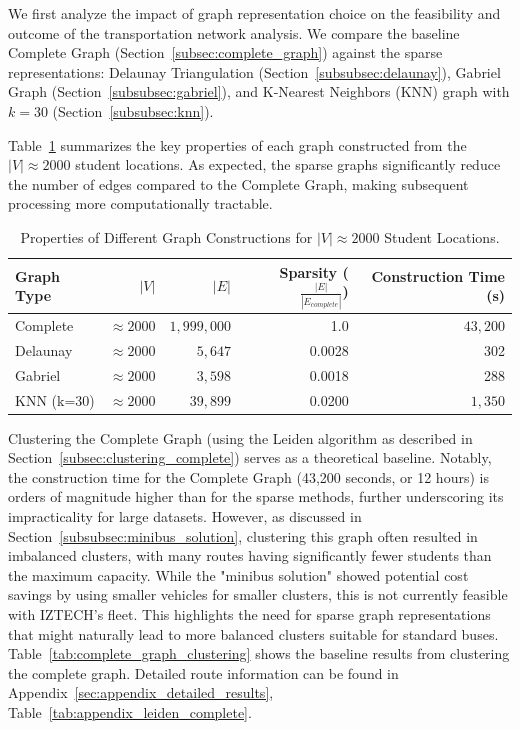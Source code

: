We first analyze the impact of graph representation choice on the feasibility and outcome of the transportation network analysis. We compare the baseline Complete Graph (Section~\ref{subsec:complete_graph}) against the sparse representations: Delaunay Triangulation (Section~\ref{subsubsec:delaunay}), Gabriel Graph (Section~\ref{subsubsec:gabriel}), and K-Nearest Neighbors (KNN) graph with $k=30$ (Section~\ref{subsubsec:knn}).

Table~\ref{tab:graph_properties} summarizes the key properties of each graph constructed from the $|V| \approx 2000$ student locations. As expected, the sparse graphs significantly reduce the number of edges compared to the Complete Graph, making subsequent processing more computationally tractable.

\begin{table}[h]
\centering
\label{tab:graph_properties}
\begin{tabular}{lrrrr}
\toprule
Graph Type & $|V|$ & $|E|$ & Sparsity ($\frac{|E|}{|E_{complete}|}$) & Construction Time (s) \\
\midrule
Complete & $\approx 2000$ & $ 1,999,000$ & 1.0 & $ 43,200$ \\
Delaunay & $\approx 2000$ & $ 5,647$ & 0.0028 & 302 \\
Gabriel & $\approx 2000$ & $ 3,598$ & 0.0018 & 288 \\
KNN (k=30) & $\approx 2000$ & $ 39,899$ & 0.0200 & $ 1,350$ \\
\bottomrule
\end{tabular}
\caption{Properties of Different Graph Constructions for $|V| \approx 2000$ Student Locations.}
\end{table}

Clustering the Complete Graph (using the Leiden algorithm as described in Section~\ref{subsec:clustering_complete}) serves as a theoretical baseline. Notably, the construction time for the Complete Graph (43,200 seconds, or 12 hours) is orders of magnitude higher than for the sparse methods, further underscoring its impracticality for large datasets. However, as discussed in Section~\ref{subsubsec:minibus_solution}, clustering this graph often resulted in imbalanced clusters, with many routes having significantly fewer students than the maximum capacity. While the "minibus solution" showed potential cost savings by using smaller vehicles for smaller clusters, this is not currently feasible with IZTECH's fleet. This highlights the need for sparse graph representations that might naturally lead to more balanced clusters suitable for standard buses. Table~\ref{tab:complete_graph_clustering} shows the baseline results from clustering the complete graph. Detailed route information can be found in Appendix~\ref{sec:appendix_detailed_results}, Table~\ref{tab:appendix_leiden_complete}.

